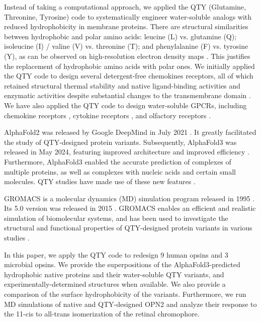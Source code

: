 \documentclass[fleqn,10pt,lineno]{manuscript}
\begin{document}
Instead of taking a computational approach, we applied the QTY (Glutamine, Threonine, Tyrosine) code to systematically engineer water-soluble analogs with reduced hydrophobicity in membrane proteins. There are structural similarities between hydrophobic and polar amino acids: leucine (L) vs. glutamine (Q); isoleucine (I) / valine (V) vs. threonine (T); and phenylalanine (F) vs. tyrosine (Y), as can be observed on high-resolution electron density maps \citep{Zhang_2018, Zhang_2022, Tegler_2020}. This justifies the replacement of hydrophobic amino acids with polar ones. We initially applied the QTY code to design several detergent-free chemokines receptors, all of which retained structural thermal stability and native ligand-binding activities and enzymatic activities despite substantial changes to the transmembrane domain \citep{Zhang_2018, Tegler_2020}. We have also applied the QTY code to design water-soluble GPCRs, including chemokine receptors \citep{Zhang_2018, Qing_2019, Tegler_2020, Skuhersky_2021}, cytokine receptors \citep{Hao_2020}, and olfactory receptors \citep{Skuhersky_2021, Johnsson_2025}. 

AlphaFold2 was released by Google DeepMind in July 2021 \citep{Jumper_2021}. It greatly facilitated the study of QTY-designed protein variants. Subsequently, AlphaFold3 was released in May 2024, featuring improved architecture and improved efficiency \citep{Abramson_2024}. Furthermore, AlphaFold3 enabled the accurate prediction of complexes of multiple proteins, as well as complexes with nucleic acids and certain small molecules. QTY studies have made use of these new features \citep{Chen_2025, Johnsson_2025}. 

GROMACS is a molecular dynamics (MD) simulation program released in 1995 \citep{Berendsen_1995}. Its 5.0 version was released in 2015 \citep{Abraham_2015}. GROMACS enables an efficient and realistic simulation of biomolecular systems, and has been used to investigate the structural and functional properties of QTY-designed protein variants in various studies \citep{Karagol_2024, Li_Tang_2024, Smorodina_2024, Li_Wang_2024, Johnsson_2025}. 

In this paper, we apply the QTY code to redesign 9 human opsins and 3 microbial opsins. We provide the superpositions of the AlphaFold3-predicted hydrophobic native proteins and their water-soluble QTY variants, and experimentally-determined structures when available. We also provide a comparison of the surface hydrophobicity of the variants. Furthermore, we run MD simulations of native and QTY-designed OPN2 and analyze their response to the 11-cis to all-trans isomerization of the retinal chromophore. 
\end{document}
